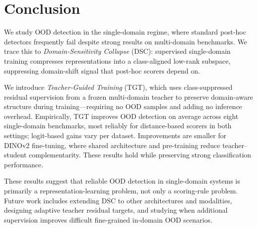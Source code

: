 \documentclass[runningheads]{llncs}
\begin{document}
\section{Conclusion}
\label{sec:conclusion}

We study OOD detection in the single-domain regime, where standard post-hoc detectors frequently fail despite strong results on multi-domain benchmarks. We trace this to \emph{Domain-Sensitivity Collapse} (DSC): supervised single-domain training compresses representations into a class-aligned low-rank subspace, suppressing domain-shift signal that post-hoc scorers depend on.

We introduce \emph{Teacher-Guided Training} (TGT), which uses class-suppressed residual supervision from a frozen multi-domain teacher to preserve domain-aware structure during training---requiring no OOD samples and adding no inference overhead. Empirically, TGT improves OOD detection on average across eight single-domain benchmarks, most reliably for distance-based scorers in both settings; logit-based gains vary per dataset. Improvements are smaller for DINOv2 fine-tuning, where shared architecture and pre-training reduce teacher--student complementarity. These results hold while preserving strong classification performance.

These results suggest that reliable OOD detection in single-domain systems is primarily a representation-learning problem, not only a scoring-rule problem. Future work includes extending DSC to other architectures and modalities, designing adaptive teacher residual targets, and studying when additional supervision improves difficult fine-grained in-domain OOD scenarios.




\end{document}
